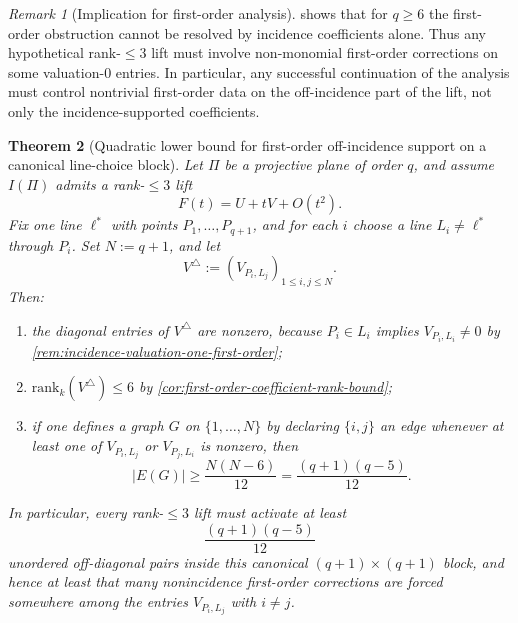 \documentclass[11pt]{amsart}
\numberwithin{equation}{section}
\theoremstyle{plain}
\newtheorem{theorem}{Theorem}[section]
\theoremstyle{definition}
\theoremstyle{remark}
\newtheorem{remark}[theorem]{Remark}
\newcommand{\rank}{\mathrm{rank}}
\begin{document}
\begin{remark}[Implication for first-order analysis]
\label{rem:note39-lambda-necessity}
 shows that for $q\ge 6$ the first-order obstruction cannot be resolved by incidence coefficients alone.
Thus any hypothetical rank-$\le 3$ lift must involve non-monomial first-order corrections on some valuation-$0$ entries.
In particular, any successful continuation of the analysis must control nontrivial first-order data on the off-incidence part of the lift, not only the incidence-supported coefficients.
\end{remark}

\begin{theorem}[Quadratic lower bound for first-order off-incidence support on a canonical line-choice block]
\label{thm:lambda-support-density-rank3}
Let $\Pi$ be a projective plane of order $q$, and assume $I(\Pi)$ admits a rank-$\le 3$ lift
\[
F(t)=U+tV+O(t^2).
\]
Fix one line $\ell^*$ with points $P_1,\dots,P_{q+1}$, and for each $i$ choose a line $L_i\neq \ell^*$ through $P_i$.
Set $N:=q+1$, and let
\[
V^{\triangle}:=(V_{P_i,L_j})_{1\le i,j\le N}.
\]
Then:
\begin{enumerate}[label=(\arabic*),leftmargin=2em]
  \item the diagonal entries of $V^{\triangle}$ are nonzero, because $P_i\in L_i$ implies $V_{P_i,L_i}\neq 0$ by \cref{rem:incidence-valuation-one-first-order};
  \item $\rank_k(V^{\triangle})\le 6$ by \cref{cor:first-order-coefficient-rank-bound};
  \item if one defines a graph $G$ on $\{1,\dots,N\}$ by declaring $\{i,j\}$ an edge whenever at least one of $V_{P_i,L_j}$ or $V_{P_j,L_i}$ is nonzero, then
  \[
  |E(G)|\ge \frac{N(N-6)}{12}=\frac{(q+1)(q-5)}{12}.
  \]
\end{enumerate}
In particular, every rank-$\le 3$ lift must activate at least
\[
\frac{(q+1)(q-5)}{12}
\]
unordered off-diagonal pairs inside this canonical $(q+1)\times(q+1)$ block, and hence at least that many nonincidence first-order corrections are forced somewhere among the entries $V_{P_i,L_j}$ with $i\neq j$.
\end{theorem}
\end{document}
